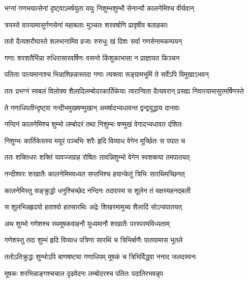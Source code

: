 \twolineshloka
{भग्नां गणभयात्सेनां दृष्ट्वाऽमर्षयुता ययुः}
{निशुम्भशुम्भौ सेनान्यौ कालनेमिश्च वीर्यवान्} %


\twolineshloka
{त्रयस्ते वारयामासुर्गणसेनां महाबलाः}
{मुञ्चतः शरवर्षाणि प्रावृषीव बलाहकाः} %

\twolineshloka
{ततो दैत्यशरौघास्ते शलभानामिव व्रजाः}
{रुरुधुः खं दिशः सर्वा गणसेनामकम्पयन्} %

\twolineshloka
{गणाः शरशतैर्भिन्ना रुधिरासारवर्षिणः}
{वसन्ते किंशुकाभासा न प्राज्ञायत किञ्चन} %

\twolineshloka
{पतिताः पात्यमानाश्च भिन्नाश्छिन्नास्तदा गणाः}
{त्यक्त्वा सङ्ग्रामभूमिं ते सर्वेऽपि विमुखाऽभवन्} %

\fourlineindentedshloka
{ततः प्रभग्नं स्वबलं विलोक्य}
{शैलादिलम्बोदरकार्तिकेयाः}
{त्वरान्विता दैत्यवरान् प्रसह्य}
{निवारयामासुरमर्षिणस्ते} %





\twolineshloka
{ते गणाधिपतीन्दृष्ट्वा नन्दीभमुखषण्मुखान्}
{अमर्षादभ्यधावन्त द्वन्द्वयुद्धाय दानवाः} %

\twolineshloka
{नन्दिनं कालनेमिश्च शुम्भो लम्बोदरं तथा}
{निशुम्भः षण्मुखं वेगादभ्यधावत दंशितः} %

\twolineshloka
{निशुम्भः कार्तिकेयस्य मयूरं पञ्चभिः शरैः}
{हृदि विव्याध वेगेन मूर्च्छितः स पपात च} %

\twolineshloka
{ततः शक्तिधरः शक्तिं यावज्जग्राह रोषितः}
{तावन्निशुम्भो वेगेन स्वशक्त्या तमपातयत्} %

\twolineshloka
{नन्दीश्वरः शरव्रातैः कालनेमिमवध्यत}
{सप्तभिश्च हयान्केतुं त्रिभिः सारथिमच्छिनत्} %

\twolineshloka
{कालनेमिस्तु सङ्क्रुद्धो धनुश्चिच्छेद नन्दिनः}
{तदपास्य स शूलेन तं वक्षस्यहनद्बली} %

\twolineshloka
{स शूलभिन्नहृदयो हताश्वो हतसारथिः}
{अद्रेः शिखरमामुच्य शैलादिं सोऽप्यपातयत्} %

\twolineshloka
{अथ शुम्भो गणेशश्च रथमूषकवाहनौ}
{युध्यमानौ शरव्रातैः परस्परमविध्यताम्} %

\twolineshloka
{गणेशस्तु तदा शुम्भं हृदि विव्याध पत्रिणा}
{सारथिं च त्रिभिर्बाणैः पातयामास भूतले} %

\twolineshloka
{ततोऽतिक्रुद्धः शुम्भोऽपि बाणषष्ट्या गणाधिपम्}
{मूषकं च त्रिभिर्विद्ध्वा ननाद जलदस्वनः} %

\twolineshloka
{मूषकः शरभिन्नाङ्गश्चचाल दृढवेदनः}
{लम्बोदरश्च पतितः पदातिरभवन्नृप} %


